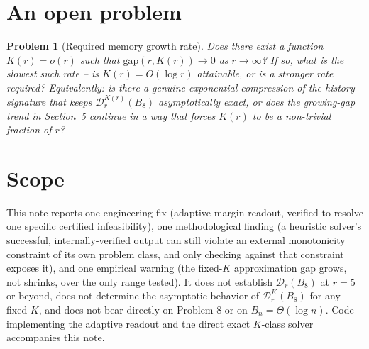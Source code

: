 \documentclass[11pt,a4paper]{article}
\newtheorem{problem}{Problem}
\newcommand{\D}{\mathscr D}
\begin{document}
\section{An open problem}

\begin{problem}[Required memory growth rate]
Does there exist a function $K(r) = o(r)$ such that
$\mathrm{gap}(r, K(r)) \to 0$ as $r\to\infty$? If so, what is the slowest
such rate -- is $K(r) = O(\log r)$ attainable, or is a stronger rate
required? Equivalently: is there a genuine exponential compression of the
history signature that keeps $\D_r^{K(r)}(B_8)$ asymptotically exact, or does
the growing-gap trend in Section~5 continue in a way that forces $K(r)$ to be
a non-trivial fraction of $r$?
\end{problem}

\section{Scope}

This note reports one engineering fix (adaptive margin readout, verified to
resolve one specific certified infeasibility), one methodological finding
(a heuristic solver's successful, internally-verified output can still
violate an external monotonicity constraint of its own problem class, and
only checking against that constraint exposes it), and one empirical warning
(the fixed-$K$ approximation gap grows, not shrinks, over the only range
tested). It does not establish $\D_r(B_8)$ at $r=5$ or beyond, does not
determine the asymptotic behavior of $\D_r^{K}(B_8)$ for any fixed $K$, and
does not bear directly on Problem 8 or on $B_n = \Theta(\log n)$. Code
implementing the adaptive readout and the direct exact $K$-class solver
accompanies this note.
\end{document}
